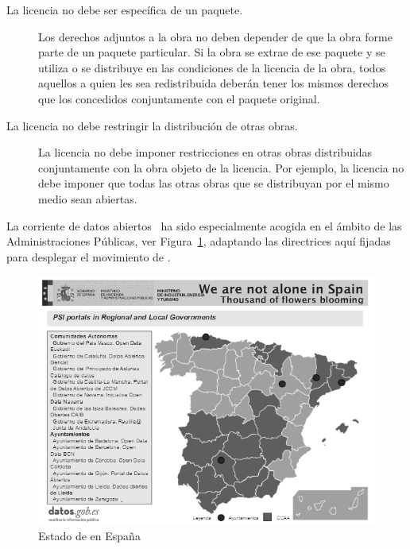 \begin{description}
 \item [La licencia no debe ser específica de un paquete.] Los derechos adjuntos a la obra no deben depender de que la obra forme parte de un paquete particular. Si la obra se extrae de ese paquete y se utiliza o se distribuye en las condiciones de la licencia de la obra, todos aquellos a quien les sea redistribuida deberán tener los mismos derechos que los concedidos conjuntamente con el paquete original.
 \item [La licencia no debe restringir la distribución de otras obras.] La licencia no debe imponer restricciones en otras obras distribuidas conjuntamente con la obra objeto de la licencia. Por ejemplo, la licencia no debe imponer que todas las otras obras que se distribuyan por el mismo medio sean abiertas.
\end{description}

La corriente de datos abiertos~\cite{odfn} ha sido especialmente acogida en el ámbito de las Administraciones
Públicas, ver Figura~\ref{fig:od-spain}, adaptando las directrices aquí fijadas para desplegar el movimiento
de \ogd. 

\begin{figure}[!htb]
\centering
	\includegraphics[width=14cm]{images/phd/open-data-spain}
\caption{Estado de \opendata en España}
\label{fig:od-spain}
\end{figure}

